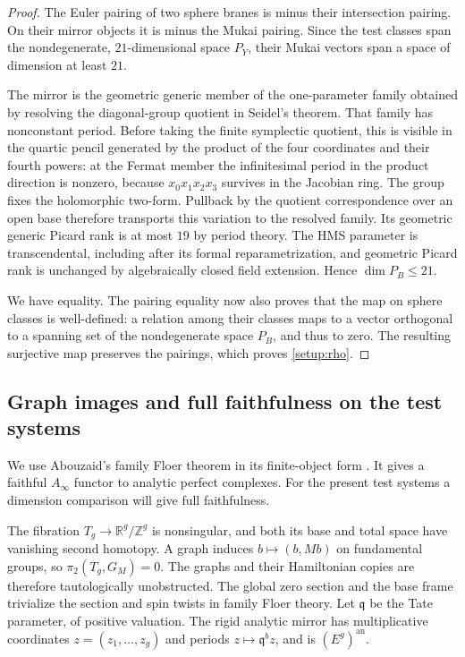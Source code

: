 \documentclass[11pt]{article}
\numberwithin{equation}{section}
\theoremstyle{definition}
\theoremstyle{remark}
\begin{document}
\begin{proof}
The Euler pairing of two sphere branes is minus their intersection
pairing.  On their mirror objects it is minus the Mukai pairing.
Since the test classes span the nondegenerate, $21$-dimensional space
$P_Y$, their Mukai vectors span a space of dimension at least $21$.

The mirror is the geometric generic member of the one-parameter family
obtained by resolving the diagonal-group quotient in Seidel's theorem.
That family has nonconstant period.  Before taking the finite symplectic
quotient, this is visible in the quartic pencil generated by the product
of the four coordinates and their fourth powers: at the Fermat member
the infinitesimal period in the product direction is nonzero, because
$x_0x_1x_2x_3$ survives in the Jacobian ring.  The group fixes the
holomorphic two-form.  Pullback by the quotient correspondence over an
open base therefore transports this variation to the resolved family.
Its geometric generic Picard rank is at most $19$ by period theory.
The HMS parameter is transcendental, including after its formal
reparametrization, and geometric Picard rank is unchanged by
algebraically closed field extension.  Hence $\dim P_B\le21$.

We have equality.  The pairing equality now also proves that the map on
sphere classes is well-defined: a relation among their classes maps to
a vector orthogonal to a spanning set of the nondegenerate space $P_B$,
and thus to zero.  The resulting surjective map preserves the pairings,
which proves \eqref{setup:rho}.
\end{proof}

\subsection{Graph images and full faithfulness on the test systems}

We use Abouzaid's family Floer theorem in its finite-object form
\cite[Theorem~2.10 and Appendix~A]{AbouzaidFaithful}.  It gives a faithful
$A_\infty$ functor to analytic perfect complexes.  For the present test
systems a dimension comparison will give full faithfulness.

The fibration $T_g\to\mathbb R^g/\mathbb Z^g$ is nonsingular, and both its base and
total space have vanishing second homotopy.  A graph induces
$b\mapsto(b,Mb)$ on fundamental groups, so
$\pi_2(T_g,G_M)=0$.  The graphs and their Hamiltonian copies are
therefore tautologically unobstructed.  The global zero section and
the base frame trivialize the section and spin twists in family Floer
theory.  Let $\mathfrak q$ be the Tate parameter, of positive valuation.
The rigid analytic mirror has multiplicative coordinates
$z=(z_1,\ldots,z_g)$ and periods $z\mapsto\mathfrak q^b z$, and is
$(E^g)^{\mathrm{an}}$.
\end{document}

